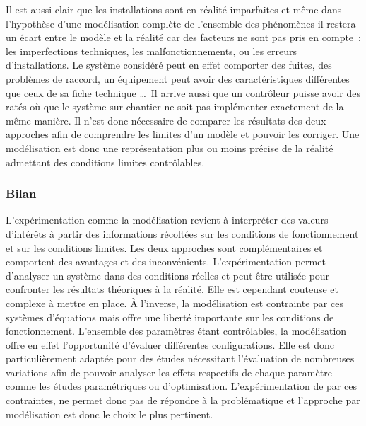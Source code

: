 Il est aussi clair que les installations sont en réalité imparfaites et même dans
l’hypothèse d’une modélisation complète de l’ensemble des phénomènes il restera un écart
entre le modèle et la réalité car des facteurs ne sont pas pris en compte~: les
imperfections techniques, les malfonctionnements, ou les erreurs d’installations. Le
système considéré peut en effet comporter des fuites, des problèmes de raccord, un
équipement peut avoir des caractéristiques différentes que ceux de sa fiche technique
\dots\ Il arrive aussi que un contrôleur puisse avoir des ratés où que le système sur chantier ne
soit pas implémenter exactement de la même manière. Il n’est donc nécessaire de comparer
les résultats des deux approches afin de comprendre les limites d’un modèle et pouvoir les
corriger. Une modélisation est donc une représentation plus ou moins précise de la
réalité admettant des conditions limites contrôlables.


\subsubsection{Bilan} %
\label{ssub:bilan}
L’expérimentation comme la modélisation revient à interpréter des valeurs d’intérêts à
partir des informations récoltées sur les conditions de fonctionnement et sur les
conditions limites. Les deux approches sont complémentaires et comportent des avantages et
des inconvénients. L’expérimentation permet d’analyser un système dans des conditions
réelles et peut être utilisée pour confronter les résultats théoriques à la réalité. Elle
est cependant couteuse et complexe à mettre en place. À l’inverse, la modélisation est
contrainte par ces systèmes d’équations mais offre une liberté importante sur les
conditions de fonctionnement. L’ensemble des paramètres étant contrôlables, la
modélisation offre en effet l’opportunité d’évaluer différentes configurations. Elle est
donc particulièrement adaptée pour des études nécessitant l’évaluation de nombreuses
variations afin de pouvoir analyser les effets respectifs de chaque paramètre comme les
études paramétriques ou d’optimisation. L’expérimentation de par ces contraintes, ne
permet donc pas de répondre à la problématique et l’approche par modélisation est donc le
choix le plus pertinent.

